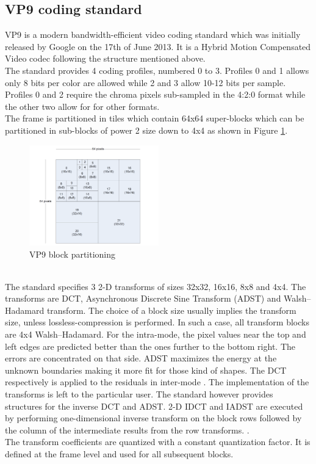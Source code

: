 \documentclass[a4paper,11pt,oneside]{article}
\begin{document}
\subsection{VP9 coding standard}
VP9 is a modern bandwidth-efficient video coding standard which was initially released by Google on the 17th of June 2013. It is a Hybrid Motion Compensated Video codec following the structure mentioned above. \\
\indent The standard provides 4 coding profiles, numbered 0 to 3. Profiles 0 and 1 allows only 8 bits per color are allowed while 2 and 3 allow 10-12 bits per sample. Profiles 0 and 2 require the chroma pixels sub-sampled in the 4:2:0 format while the other two allow for for other formats\cite[pp.~23]{vp9_bitstream}.\\
\indent The frame is partitioned in tiles which contain 64x64 super-blocks which can be partitioned in sub-blocks of power 2 size down to 4x4 as shown in Figure \ref{figure:vp9_block_partitioning}.
\begin{figure}[h]
  \centering
  \includegraphics[width=0.5\textwidth]{../figures/frame_partitioning.pdf}
  \caption{VP9 block partitioning \cite[pp.~15]{vp9_bitstream}}
  \label{figure:vp9_block_partitioning}
\end{figure} \\
\indent The standard specifies 3 2-D transforms of sizes 32x32, 16x16, 8x8 and 4x4. The transforms are DCT, Asynchronous Discrete Sine Transform (ADST) and Walsh–Hadamard transform. The choice of a block size usually implies the transform size, unless lossless-compression is performed. In such a case, all transform blocks are 4x4 Walsh–Hadamard. For the intra-mode, the pixel values near the top and left edges are predicted better than the ones further to the bottom right. The errors are concentrated on that side. ADST maximizes the energy at the unknown boundaries making it more fit for those kind of shapes. The DCT respectively is applied to the residuals in inter-mode \cite[pp.~16]{vp9_bitstream}. The implementation of the transforms is left to the particular user. The standard however provides structures for the inverse DCT and ADST. 2-D IDCT and IADST are executed by performing one-dimensional inverse transform on the block rows followed by the column of the intermediate results from the row transforms. \cite[pp.~18-19]{vp9_bitstream}. \\
The transform coefficients are quantized with a constant quantization factor. It is defined at the frame level and used for all subsequent blocks. 
\end{document}
